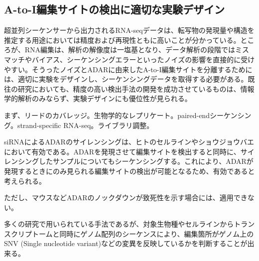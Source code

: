 \subsection{A-to-I編集サイトの検出に適切な実験デザイン}
超並列シーケンサーから出力されるRNA-seqデータは、転写物の発現量や構造を推定する用途においては精度および再現性ともに高いことが分かっている。ところが、RNA編集は、解析の解像度は一塩基となり、データ解析の段階ではミスマッチやバイアス、シーケンシングエラーといったノイズの影響を直接的に受けやすい。そうったノイズとADARに由来したA-to-I編集サイトを分離するためには、適切に実験をデザインし、シーケンシングデータを取得する必要がある。既往の研究においても、精度の高い検出手法の開発を成功させているものは、情報学的解析のみならず、実験デザインにも優位性が見られる。
\par
まず、リードのカバレッジ。生物学的なレプリケート。paired-endシーケンシング。strand-specific RNA-seq。ライブラリ調整。

siRNAによるADARのサイレンシングは、ヒトのセルラインやショウジョウバエにおいて有効である。ADARを発現させて編集サイトを検出すると同時に、サイレンシングしたサンプルについてもシーケンシングする。これにより、ADARが発現するときにのみ見られる編集サイトの検出が可能となるため、有効であると考えられる。

ただし、マウスなどADARのノックダウンが致死性を示す場合には、適用できない。
\par
多くの研究で用いられている手法であるが、対象生物種やセルラインからトランスクリプトームと同時にゲノム配列のシーケンスにより、編集箇所がゲノム上のSNV (Single nucleotide variant)などの変異を反映しているかを判断することが出来る。
